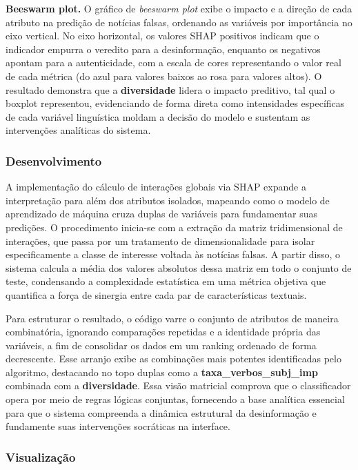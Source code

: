 \documentclass[
  brazilian,
  11pt,
]{article}
\begin{document}
\textbf{Beeswarm plot.} O gráfico de \emph{beeswarm plot} exibe o impacto e a direção de cada atributo na predição de notícias falsas, ordenando as variáveis por importância no eixo vertical. No eixo horizontal, os valores SHAP positivos indicam que o indicador empurra o veredito para a desinformação, enquanto os negativos apontam para a autenticidade, com a escala de cores representando o valor real de cada métrica (do azul para valores baixos ao rosa para valores altos). O resultado demonstra que a \textbf{diversidade} lidera o impacto preditivo, tal qual o boxplot representou, evidenciando de forma direta como intensidades específicas de cada variável linguística moldam a decisão do modelo e sustentam as intervenções analíticas do sistema.

\subsubsection{Desenvolvimento}\label{desenvolvimento}

A implementação do cálculo de interações globais via SHAP expande a interpretação para além dos atributos isolados, mapeando como o modelo de aprendizado de máquina cruza duplas de variáveis para fundamentar suas predições. O procedimento inicia-se com a extração da matriz tridimensional de interações, que passa por um tratamento de dimensionalidade para isolar especificamente a classe de interesse voltada às notícias falsas. A partir disso, o sistema calcula a média dos valores absolutos dessa matriz em todo o conjunto de teste, condensando a complexidade estatística em uma métrica objetiva que quantifica a força de sinergia entre cada par de características textuais.

Para estruturar o resultado, o código varre o conjunto de atributos de maneira combinatória, ignorando comparações repetidas e a identidade própria das variáveis, a fim de consolidar os dados em um ranking ordenado de forma decrescente. Esse arranjo exibe as combinações mais potentes identificadas pelo algoritmo, destacando no topo duplas como a \textbf{taxa\_verbos\_subj\_imp} combinada com a \textbf{diversidade}. Essa visão matricial comprova que o classificador opera por meio de regras lógicas conjuntas, fornecendo a base analítica essencial para que o sistema compreenda a dinâmica estrutural da desinformação e fundamente suas intervenções socráticas na interface.

\subsubsection{Visualização}\label{visualizauxe7uxe3o}
\end{document}
